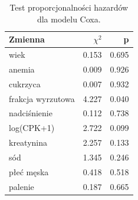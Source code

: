 \begin{table}[htbp]
\centering
\caption{Test proporcjonalności hazardów dla modelu Coxa.}
\label{tab:ph}
\small
\setlength{\tabcolsep}{1.5pt}
\begin{tabular}{lrr}
\toprule
Zmienna & $\chi^2$ & p \\
\midrule
wiek & 0.153 & 0.695 \\
anemia & 0.009 & 0.926 \\
cukrzyca & 0.007 & 0.932 \\
frakcja wyrzutowa & 4.227 & 0.040 \\
nadciśnienie & 0.112 & 0.738 \\
log(CPK+1) & 2.722 & 0.099 \\
kreatynina & 2.257 & 0.133 \\
sód & 1.345 & 0.246 \\
płeć męska & 0.418 & 0.518 \\
palenie & 0.187 & 0.665 \\
\bottomrule
\end{tabular}
\end{table}
